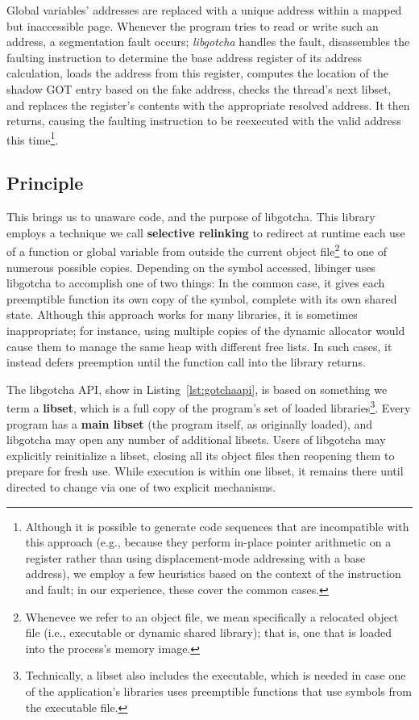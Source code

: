 Global variables' addresses are replaced with a unique address within a mapped but
inaccessible page.  Whenever the program tries to read or write such an address, a
segmentation fault occurs; \textit{libgotcha} handles the fault, disassembles the
faulting instruction to determine the base address register of its address
calculation, loads the address from this register, computes the location of the
shadow GOT entry based on the fake address, checks the thread's next libset, and
replaces the register's contents with the appropriate resolved address.  It then
returns, causing the faulting instruction to be reexecuted with the valid address
this time\footnote{Although it is possible to
generate code sequences that are incompatible with this approach (e.g., because they
perform in-place pointer arithmetic on a register rather than using displacement-mode
addressing with a base address), we employ a few heuristics based on the context of
the instruction and fault; in our experience, these cover the common cases.}.



\subsection{Principle}

This brings us to unaware code, and the purpose of libgotcha.  This library employs
a technique we call \textbf{selective relinking} to redirect at runtime each use of a
function or global variable from outside the current object file\footnote{Whenevee we
refer to an object file, we mean specifically a relocated object file (i.e.,
executable or dynamic shared library); that is, one that is loaded into the process's
memory image.} to one of numerous possible copies.  Depending on the symbol accessed,
libinger uses libgotcha to accomplish one of two things:  In the common case, it
gives each preemptible function its own copy of the symbol, complete with its own
shared state.  Although this approach works for many libraries, it is sometimes
inappropriate; for instance, using multiple copies of the dynamic allocator would
cause them to manage the same heap with different free lists.  In such cases, it
instead defers preemption until the function call into the library returns.

The libgotcha API, show in Listing~\ref{lst:gotchaapi}, is based on something we term
a \textbf{libset}, which is a full copy of the program's set of loaded
libraries\footnote{Technically, a libset also includes the executable, which is
needed in case one of the application's libraries uses preemptible functions that use
symbols from the executable file.}.  Every program has a \textbf{main libset} (the
program itself, as originally loaded), and libgotcha may open any number of
additional libsets.  Users of libgotcha may explicitly reinitialize a libset, closing
all its object files then reopening them to prepare for fresh use.  While execution
is within one libset, it remains there until directed to change via one of two
explicit mechanisms.

